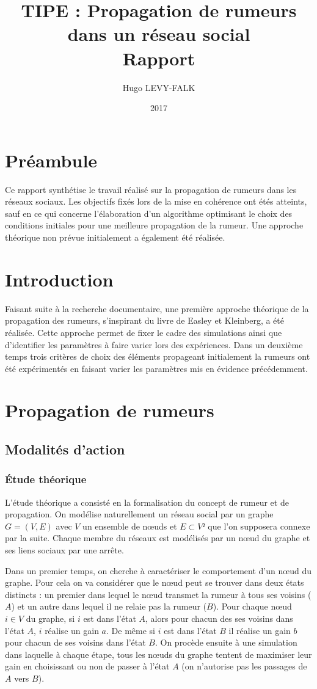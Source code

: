 \documentclass{article}
\title{TIPE : Propagation de rumeurs dans un réseau social\\Rapport}
\author{Hugo LEVY-FALK}
\date{2017}
\begin{document}
\maketitle
{}\;
\tableofcontents
\newpage

\section{Préambule}
Ce rapport synthétise le travail réalisé sur la propagation de rumeurs dans les réseaux sociaux. Les objectifs fixés lors de la mise en cohérence ont étés atteints, sauf en ce qui concerne l'élaboration d'un algorithme optimisant le choix des conditions initiales pour une meilleure propagation de la rumeur. Une approche théorique non prévue initialement a également été réalisée.

\section{Introduction}
Faisant suite à la recherche documentaire, une première approche théorique de la propagation des rumeurs, s'inspirant du livre de Easley et Kleinberg, a été réalisée. Cette approche permet de fixer le cadre des simulations ainsi que d'identifier les paramètres à faire varier lors des expériences. Dans un deuxième temps trois critères de choix des éléments propageant initialement la rumeurs ont été expérimentés en faisant varier les paramètres mis en évidence précédemment.

\section{Propagation de rumeurs}
\subsection{Modalités d'action}
\subsubsection{Étude théorique}
L'étude théorique a consisté en la formalisation du concept de rumeur et de propagation. On modélise naturellement un réseau social par un graphe $G = (V,E)$ avec $V$ un ensemble de nœuds et $E\subset V²$ que l'on supposera connexe par la suite. Chaque membre du réseaux est modélisés par un nœud du graphe et ses liens sociaux par une arrête.

Dans un premier temps, on cherche à caractériser le comportement d'un nœud du graphe. Pour cela on va considérer que le nœud peut se trouver dans deux états distincts : un premier dans lequel le nœud transmet la rumeur à tous ses voisins ($A$) et un autre dans lequel il ne relaie pas la rumeur ($B$). Pour chaque nœud $i\in V$ du graphe, si $i$ est dans l'état $A$, alors pour chacun des ses voisins dans l'état $A$, $i$ réalise un gain $a$. De même si $i$ est dans l'état $B$ il réalise un gain $b$ pour chacun de ses voisins dans l'état $B$. On procède ensuite à une simulation dans laquelle à chaque étape, tous les nœuds du graphe tentent de maximiser leur gain en choisissant ou non de passer à l'état $A$ (on n'autorise pas les passages de $A$ vers $B$).
\end{document}
